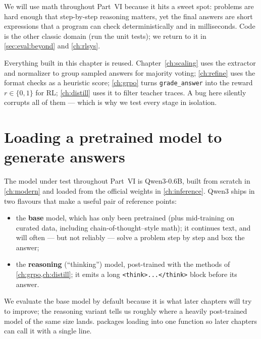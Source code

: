 We will use math throughout Part~VI because it hits a sweet spot: problems are hard enough that
step-by-step reasoning matters, yet the final answers are short expressions that a program can
check deterministically and in milliseconds. Code is the other classic domain (run the unit
tests); we return to it in \cref{sec:eval:beyond} and \cref{ch:rlsys}.

\begin{keyidea}
Everything built in this chapter is reused. Chapter~\ref{ch:scaling} uses the extractor and
normalizer to group sampled answers for majority voting; \cref{ch:refine} uses the format
checks as a heuristic score; \cref{ch:grpo} turns \texttt{grade\_answer} into the reward
$r \in \{0,1\}$ for RL; \cref{ch:distill} uses it to filter teacher traces. A bug here
silently corrupts all of them --- which is why we test every stage in isolation.
\end{keyidea}

\section{Loading a pretrained model to generate answers}\label{sec:eval:load}


The model under test throughout Part~VI is Qwen3-0.6B, built from scratch in \cref{ch:modern}
and loaded from the official weights in \cref{ch:inference}. Qwen3 ships in two flavours that
make a useful pair of reference points:

\begin{itemize}
  \item the \textbf{base} model, which has only been pretrained (plus mid-training on
  curated data, including chain-of-thought--style math); it continues text, and will often
  --- but not reliably --- solve a problem step by step and box the answer;
  \item the \textbf{reasoning} (``thinking'') model, post-trained with the methods of
  \cref{ch:grpo,ch:distill}; it emits a long \texttt{<think>...</think>} block before its answer.
\end{itemize}

We evaluate the base model by default because it is what later chapters will try to improve;
the reasoning variant tells us roughly where a heavily post-trained model of the same size lands.
 packages loading into one function so later chapters can call it with a
single line.

